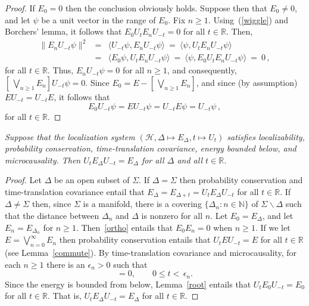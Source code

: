 \documentclass[12pt]{article}
\theoremstyle{remark}
\newcommand{\hil}[1]{\mathcal{#1}}
\begin{document}
\begin{appendix}
\begin{proof} If $E_{0}=0$ then the conclusion obviously
  holds.  Suppose then that $E_{0}\neq 0$, and let $\psi$ be a unit
  vector in the range of $E_{0}$.  Fix $n\geq 1$.
  Using~(\ref{wiggle}) and Borchers' lemma, it follows that
  $E_{0}U_{t}E_{n}U_{-t}=0$ for all $t\in \mathbb{R}$.  Then,
\begin{eqnarray}
\| E_{n}U_{-t}\psi \| ^{2} &=&\langle U_{-t}\psi ,E_{n}U_{-t}\psi \rangle \:=\: \langle \psi
,U_{t}E_{n}U_{-t}\psi \rangle \\
&=& \langle E_{0}\psi
,U_{t}E_{n}U_{-t}\psi \rangle \:=\: \langle \psi
,E_{0}U_{t}E_{n}U_{-t}\psi \rangle 
\:=\: 0\, ,\end{eqnarray}
for all $t\in \mathbb{R}$.  Thus, $E_{n}U_{-t}\psi =0$ for all $n\geq 1$, and consequently, 
$[\,\bigvee _{n\geq 1}E_{n}]U_{-t}\psi =0$.  Since $E_{0}=E-[\, \bigvee
_{n\geq 1}E_{n}]$, and since (by assumption) $EU_{-t}=U_{-t}E$, it follows that \begin{equation}
E_{0}U_{-t}\psi =EU_{-t}\psi =U_{-t}E\psi =U_{-t}\psi \,, \end{equation}
for all $t\in \mathbb{R}$.  \end{proof}

\vspace{0.5em}   {\it Suppose
  that the localization system $(\hil{H}, \Delta \mapsto
  E_{\Delta},t\mapsto U_{t})$ satisfies localizability, probability
  conservation, time-translation covariance, energy bounded below, and
  microcausality.  Then $U_{t}E_{\Delta}U_{-t}=E_{\Delta}$ for all
  $\Delta$ and all $t\in \mathbb{R}$.}

\begin{proof} Let $\Delta$ be an open subset of $\Sigma$.  
  If $\Delta =\Sigma$ then probability conservation and
  time-translation covariance entail that $E_{\Delta}=E_{\Delta
    +t}=U_{t}E_{\Delta}U_{-t}$ for all $t\in \mathbb{R}$.  If $\Delta
  \neq \Sigma$ then, since $\Sigma$ is a manifold, there is a covering
  $\{ \Delta _{n}:n\in \mathbb{N} \}$ of $\Sigma \backslash \Delta$
  such that the distance between $\Delta _{n}$ and $\Delta $ is
  nonzero for all $n$.  Let $E_{0}=E_{\Delta}$, and let
  $E_{n}=E_{\Delta _{n}}$ for $n\geq 1$.  Then~\ref{ortho} entails
  that $E_{0}E_{n}=0$ when $n\geq 1$.  If we let $E=\bigvee
  _{n=0}^{\infty}E_{n}$ then probability conservation entails that
  $U_{t}EU_{-t}=E$ for all $t\in \mathbb{R}$ (see
  Lemma~\ref{commute}).  By time-translation covariance and
  microcausality, for each $n\geq 1$ there is an $\epsilon _{n}>0$
  such that
\begin{equation} [E_{0},U_{t}E_{n}U_{-t}]=0 , \qquad 0\leq t< \,\epsilon
  _{n}.
\end{equation}  Since the energy is bounded from below, Lemma~\ref{root} entails that 
$U_{t}E_{0}U_{-t}=E_{0}$ for all $t\in \mathbb{R}$.  That is,
$U_{t}E_{\Delta}U_{-t}=E_{\Delta}$ for all $t\in \mathbb{R}$.
\end{proof}


\end{appendix}
\end{document}
